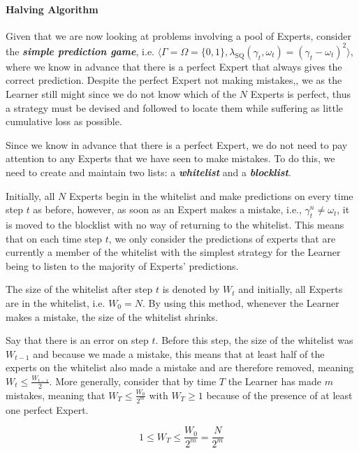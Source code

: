\paragraph{Halving Algorithm}\label{paragraph:halving_algorithm}
Given that we are now looking at problems involving a pool of Experts, consider the \textbf{\textit{simple prediction game}}, i.e. $\langle \Gamma = \Omega = \{0, 1\}, \lambda_\text{SQ}(\gamma_t, \omega_t) = {(\gamma_t - \omega_t)}^2 \rangle$, where we know in advance that there is a perfect Expert that always gives the correct prediction. Despite the perfect Expert not making mistakes,, we as the Learner still might since we do not know which of the $N$ Experts is perfect, thus a strategy must be devised and followed to locate them while suffering as little cumulative loss as possible.

Since we know in advance that there is a perfect Expert, we do not need to pay attention to any Experts that we have seen to make mistakes. To do this, we need to create and maintain two lists: a \textbf{\textit{whitelist}} and a \textbf{\textit{blocklist}}.

Initially, all $N$ Experts begin in the whitelist and make predictions on every time step $t$ as before, however, as soon as an Expert makes a mistake, i.e., $\gamma^n_t \neq \omega_t$, it is moved to the blocklist with no way of returning to the whitelist. This means that on each time step $t$, we only consider the predictions of experts that are currently a member of the whitelist with the simplest strategy for the Learner being to listen to the majority of Experts' predictions.

The size of the whitelist after step $t$ is denoted by $W_t$ and initially, all Experts are in the whitelist, i.e. $W_0 = N$. By using this method, whenever the Learner makes a mistake, the size of the whitelist shrinks.

Say that there is an error on step $t$. Before this step, the size of the whitelist was $W_{t-1}$ and because we made a mistake, this means that at least half of the experts on the whitelist also made a mistake and are therefore removed, meaning $W_{t} \leq \frac{W_{t-1}}{2}$. More generally, consider that by time $T$ the Learner has made $m$ mistakes, meaning that $W_T \leq \frac{W_0}{2^m}$ with $W_T \geq 1$ because of the presence of at least one perfect Expert.

\begin{equation}
    1 \leq W_T \leq \frac{W_0}{2^m} = \frac{N}{2^m}
\end{equation}

